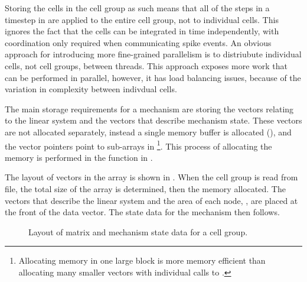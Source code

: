 \begin{note}
Storing the cells in the cell group as such means that all of the steps in a timestep in  are applied to the entire cell group, not to individual cells.
This ignores the fact that the cells can be integrated in time independently, with coordination only required when communicating spike events.
An obvious approach for introducing more fine-grained parallelism is to distriubute individual cells, not cell groups, between threads.
This approach exposes more work that can be performed in parallel, however, it has load balancing issues, because of the variation in complexity between indivdual cells.
\end{note}

The main storage requirements for a mechanism are storing the vectors relating to the linear system and the vectors that describe mechanism state.
These vectors are not allocated separately, instead a single memory buffer is allocated (), and the vector pointers point to sub-arrays in 
\footnote{
Allocating memory in one large block is more memory efficient than allocating many smaller vectors with individual calls to .
}.
This process of allocating the memory is performed in the function  in .

The layout of vectors in the  array is shown in \fig{}.
When the cell group is read from file, the total size of the  array is determined, then the memory allocated.
The vectors that describe the linear system and the area of each node, , are placed at the front of the data vector.
The state data for the mechanism then follows.

\begin{figure}[htp!]

\caption{Layout of matrix and mechanism state data for a cell group.}
\end{figure}


